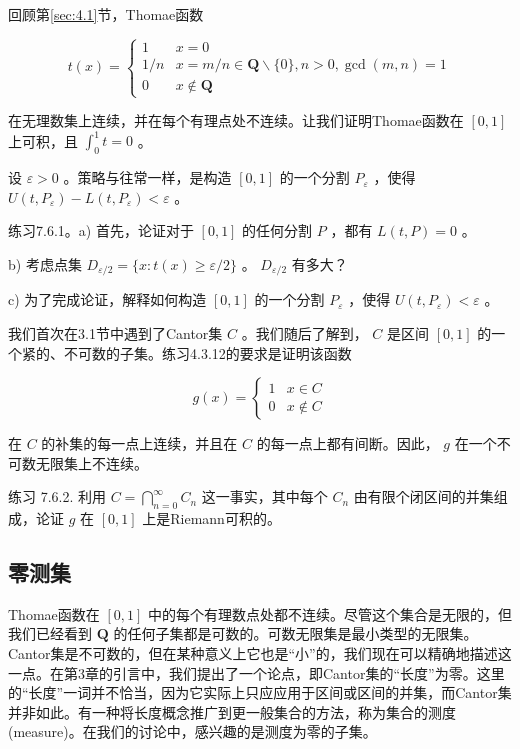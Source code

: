 回顾第\ref{sec:4.1}节，Thomae函数

\[
t\left( x\right)  = \left\{  \begin{array}{ll} 1 &x = 0 \\  1/n & x = m/n \in  \mathbf{Q} \smallsetminus  \{ 0\} ,n > 0, \gcd(m,n) = 1 \\  0 & x \notin  \mathbf{Q} \end{array}\right.
\]

在无理数集上连续，并在每个有理点处不连续。让我们证明Thomae函数在 \(\left\lbrack  {0,1}\right\rbrack\) 上可积，且 \({\int }_{0}^{1}t = 0\) 。

设 \(\varepsilon  > 0\) 。策略与往常一样，是构造 \(\left\lbrack  {0,1}\right\rbrack\) 的一个分割 \({P}_{\varepsilon }\) ，使得 \(U\left( {t,{P}_{\varepsilon }}\right)  - L\left( {t,{P}_{\varepsilon }}\right)  < \varepsilon\) 。

练习7.6.1。a) 首先，论证对于 \(\left\lbrack  {0,1}\right\rbrack\) 的任何分割 \(P\) ，都有 \(L\left( {t,P}\right)  = 0\) 。

b) 考虑点集 \({D}_{\varepsilon /2} = \{ x : t\left( x\right)  \geq  \varepsilon /2\}\) 。 \({D}_{\varepsilon /2}\) 有多大？

c) 为了完成论证，解释如何构造 \(\left\lbrack  {0,1}\right\rbrack\) 的一个分割 \({P}_{\varepsilon }\) ，使得 \(U\left( {t,{P}_{\varepsilon }}\right)  < \varepsilon\) 。

我们首次在3.1节中遇到了Cantor集 \(C\) 。我们随后了解到， \(C\) 是区间 \(\left\lbrack  {0,1}\right\rbrack\) 的一个紧的、不可数的子集。练习4.3.12的要求是证明该函数

\[
g\left( x\right)  = \left\{  \begin{array}{ll} 1 & x \in  C \\  0 & x \notin  C \end{array}\right.
\]

在 \(C\) 的补集的每一点上连续，并且在 \(C\) 的每一点上都有间断。因此， \(g\) 在一个不可数无限集上不连续。

练习 7.6.2. 利用 \(C = \mathop{\bigcap }\limits_{{n = 0}}^{\infty }{C}_{n}\) 这一事实，其中每个 \({C}_{n}\) 由有限个闭区间的并集组成，论证 \(g\) 在 \(\left\lbrack  {0,1}\right\rbrack\) 上是Riemann可积的。

\subsection{零测集}

Thomae函数在 \(\left\lbrack  {0,1}\right\rbrack\) 中的每个有理数点处都不连续。尽管这个集合是无限的，但我们已经看到 \(\mathbf{Q}\) 的任何子集都是可数的。可数无限集是最小类型的无限集。Cantor集是不可数的，但在某种意义上它也是“小”的，我们现在可以精确地描述这一点。在第3章的引言中，我们提出了一个论点，即Cantor集的“长度”为零。这里的“长度”一词并不恰当，因为它实际上只应应用于区间或区间的并集，而Cantor集并非如此。有一种将长度概念推广到更一般集合的方法，称为集合的测度(measure)。在我们的讨论中，感兴趣的是测度为零的子集。



